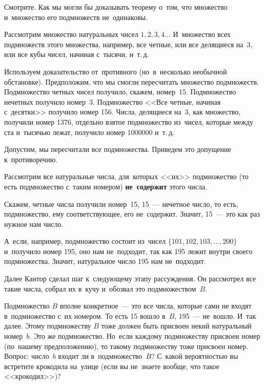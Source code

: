 Смотрите. Как мы могли бы доказывать теорему о~том, что множество и~множество его подмножеств
не~одинаковы.

Рассмотрим множество натуральных чисел $1,2,3,4\ldots$ И~множество всех подмножеств этого
множества, например, все четные, или все делящиеся на~3, или все кубы чисел, начиная с~тысячи, и~т.\,д.

Используем доказательство от~противного (но~в~несколько необычной обстановке). Предположим, что мы
смогли пересчитать множество подмножеств. Подмножество четных чисел получило, скажем, номер~15.
Подмножество нечетных получило номер~3. Подмножество <<Все четные, начиная с~десятки>> получило
номер 156. Числа, делящиеся на~3, как множество, получили номер 1376, отдельно взятое подмножество
из~чисел, которые между ста и~тысячью лежат, получило номер 1000000 и~т.\,д.

Допустим, мы пересчитали все подмножества. Приведем это допущение к~противоречию.

Рассмотрим все натуральные числа, для~которых <<их>> подмножество (то есть подмножество с~таким
номером) \textbf{не~содержит} этого числа.

Скажем, четные числа получили номер~15, 15~--- нечетное число, то есть, подмножество, ему
соответствующее, его не~содержит.
 Значит, 15~--- это как раз нужное нам число.

А~если, например, подмножество состоит из~чисел $\{101, 102,\allowbreak 103,\ldots, 200\}$ и~получило номер 195, оно нам
не~подходит, так как 195 лежит внутри своего подмножества. Значит, натуральное число 195 нам
не~подходит.

Далее Кантор сделал шаг к~следующему этапу рассуждения. Он рассмотрел все такие числа, собрал их
в~кучу и~обозвал это подмножеством~$B$.

Подмножество $B$ вполне конкретное~--- это все числа, которые сами не входят
в~подмножество с~их номером.
То есть 15 вошло в~$B$, 195~--- не~вошло. И~так далее. Этому
подмножеству $B$ тоже должен быть присвоен некий натуральный номер~$b$. Это же подмножество. Но~если
каждому подмножеству присвоен номер (по~нашему предположению), то такому подмножеству тоже присвоен
номер. Вопрос: число~$b$ входит ли в~подмножество~$B$? С~какой вероятностью вы встретите крокодила
на~улице (если вы не~знаете вообще, что такое <<крокодил>>)?

